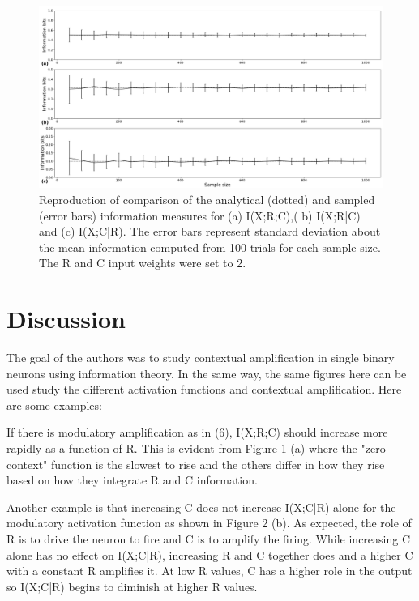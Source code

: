 \begin{figure}[H]
    \includegraphics[width=\textwidth]{figure_3.png}
      \caption{Reproduction of comparison of the analytical (dotted) and sampled (error bars) information measures for (a) I(X;R;C),( b) I(X;R|C) and (c) I(X;C|R). The error bars represent standard deviation about the mean information computed from 100 trials for each sample size. The R and C input weights were set to 2.}
\end{figure}

\section{Discussion}

The goal of the authors was to study contextual amplification in single binary neurons using information theory.  In the same way, the same figures here can be used study the different activation functions and contextual amplification. Here are some examples: \newline

If there is modulatory amplification as in (6), I(X;R;C) should increase more rapidly as a function of R. This is evident from Figure 1 (a) where the "zero context" function is the slowest to rise and the others differ in how they rise based on how they integrate R and C information. \newline

Another example is that increasing C does not increase I(X;C|R) alone for the modulatory activation function as shown in Figure 2 (b). As expected, the role of R is to drive the neuron to fire and C is to amplify the firing. While increasing C alone has no effect on I(X;C|R), increasing R and C together does and a higher C with a constant R amplifies it. At low R values, C has a higher role in the output so I(X;C|R) begins to diminish at higher R values. \newline

